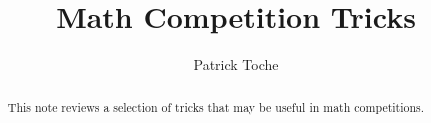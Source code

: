 \documentclass[12pt]{article}
\title{Math Competition Tricks}
\author{Patrick Toche}
\begin{document}
\maketitle
\begin{minipage}{\textwidth}
\maketitle
\begin{abstract}
This note reviews a selection of tricks that may be useful in math competitions.
\end{abstract}
\end{minipage}

\newpage













\newpage%







\newpage%



\newpage%



\newpage%





\newpage%




\end{document}
